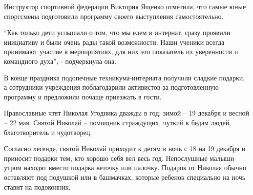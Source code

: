 
Инструктор спортивной федерации Виктория Ященко отметила, что самые юные
спортсмены подготовили программу своего выступления самостоятельно.


\enquote{Как только дети услышали о том, что мы едем в интернат, сразу проявили
инициативу и были очень рады такой возможности. Наши ученики всегда принимают
участие в мероприятиях, для них это показатель их уверенности и командного
духа}, - подчеркнула она.

В конце праздника подопечные техникума-интерната получили сладкие подарки, а
сотрудники учреждения поблагодарили активистов за подготовленную программу и
предложили почаще приезжать в гости.

Православные чтят Николая Угодника дважды в год: зимой – 19 декабря и весной –
22 мая. Святой Николай – помощник страждущих, чуткий к бедам людей,
благотворитель и чудотворец.

Согласно легенде, святой Николай приходит к детям в ночь с 18 на 19 декабря и
приносит подарки тем, кто хорошо себя вел весь год. Непослушные малыши утром
находят вместо подарка веточку или палочку. Подарок от Николая обычно оставляют
под подушкой или в башмачках, которые ребенок специально на ночь ставит на
подоконник.


